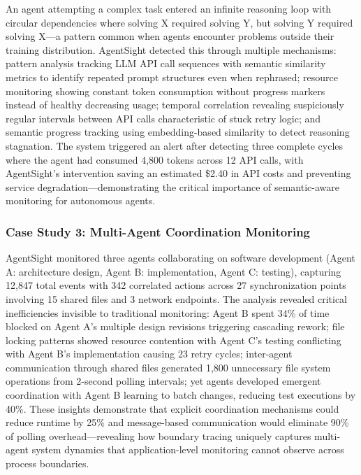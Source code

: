 An agent attempting a complex task entered an infinite reasoning loop with circular dependencies where solving X required solving Y, but solving Y required solving X—a pattern common when agents encounter problems outside their training distribution. AgentSight detected this through multiple mechanisms: pattern analysis tracking LLM API call sequences with semantic similarity metrics to identify repeated prompt structures even when rephrased; resource monitoring showing constant token consumption without progress markers instead of healthy decreasing usage; temporal correlation revealing suspiciously regular intervals between API calls characteristic of stuck retry logic; and semantic progress tracking using embedding-based similarity to detect reasoning stagnation. The system triggered an alert after detecting three complete cycles where the agent had consumed 4,800 tokens across 12 API calls, with AgentSight's intervention saving an estimated \$2.40 in API costs and preventing service degradation—demonstrating the critical importance of semantic-aware monitoring for autonomous agents.

\subsubsection{Case Study 3: Multi-Agent Coordination Monitoring}

AgentSight monitored three agents collaborating on software development (Agent A: architecture design, Agent B: implementation, Agent C: testing), capturing 12,847 total events with 342 correlated actions across 27 synchronization points involving 15 shared files and 3 network endpoints. The analysis revealed critical inefficiencies invisible to traditional monitoring: Agent B spent 34\% of time blocked on Agent A's multiple design revisions triggering cascading rework; file locking patterns showed resource contention with Agent C's testing conflicting with Agent B's implementation causing 23 retry cycles; inter-agent communication through shared files generated 1,800 unnecessary file system operations from 2-second polling intervals; yet agents developed emergent coordination with Agent B learning to batch changes, reducing test executions by 40\%. These insights demonstrate that explicit coordination mechanisms could reduce runtime by 25\% and message-based communication would eliminate 90\% of polling overhead—revealing how boundary tracing uniquely captures multi-agent system dynamics that application-level monitoring cannot observe across process boundaries.


